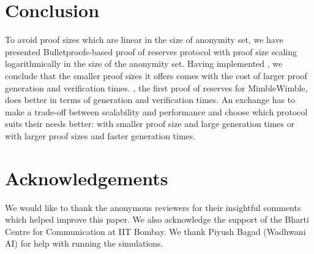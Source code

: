   
  \section{Conclusion}
  To avoid proof sizes which are linear in the size of anonymity set, we have presented Bulletproofs-based proof of reserves protocol \RB with proof size scaling logarithmically in the size of the anonymity set.
  Having implemented \RBw, we conclude that the smaller proof sizes it offers comes with the cost of larger proof generation and verification times.
  \Rw, the first proof of reserves for MimbleWimble, does better in terms of generation and verification times.
  An exchange has to make a trade-off between scalability and performance and choose which protocol suits their needs better: \RB with smaller proof size and large generation times or \R with larger proof sizes and faster generation times. 
  
  
  \section*{Acknowledgements}
  We would like to thank the anonymous reviewers for their insightful comments which helped improve this paper.
  We also acknowledge the support of the Bharti Centre for Communication at IIT Bombay. 
  We thank Piyush Bagad (Wadhwani AI) for help with running the simulations.
  
  
  
  
